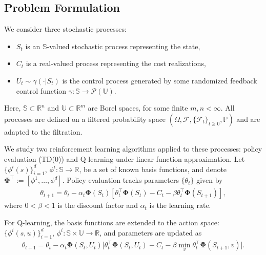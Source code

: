 \documentclass[11pt]{article}
\def\P{{\mathcal P}}
\begin{document}
\subsection{Problem Formulation}

We consider three stochastic processes:
\begin{itemize}
\item $S_t$ is an $\mathds{S}$-valued stochastic process representing the state,
\item $C_t$ is a real-valued process representing the cost realizations,
\item $U_t\sim\gamma(\cdot|S_t)$ is the control process generated by some randomized  feedback control function $\gamma:\mathds{S}\to\P(\mathds{U})$.
\end{itemize}
Here, $\mathds{S} \subset \mathds{R}^n$ and $\mathds{U} \subset \mathds{R}^m$ are Borel spaces, for some finite $m,n<\infty$. All processes are defined on a filtered probability space $(\Omega,\mathcal{F},\{\mathcal{F}_t\}_{t\ge 0},\mathbb{P})$ and are adapted to the filtration.

We study two reinforcement learning algorithms applied to these processes: policy evaluation (TD(0)) and Q-learning under linear function approximation. Let $\{\phi^i(s)\}_{i=1}^d$, $\phi^i: \mathds{S} \to \mathds{R}$, be a set of known basis functions, and denote $\mathbf{\Phi}^\intercal := [\phi^1, \dots, \phi^d]$. Policy evaluation tracks parameters $\{\theta_t\}$ given by
\begin{align}\label{main_iter_0}
\theta_{t+1} = \theta_t - \alpha_t \mathbf{\Phi}(S_t) \left[ \theta_t^\intercal \mathbf{\Phi}(S_t) - C_t - \beta \theta_t^\intercal \mathbf{\Phi}(S_{t+1}) \right],
\end{align}
where $0 < \beta < 1$ is the discount factor and $\alpha_t$ is the learning rate.

For Q-learning, the basis functions are extended to the action space: $\{\phi^i(s,u)\}_{i=1}^d$, $\phi^i: \mathds{S} \times \mathds{U} \to \mathds{R}$, and parameters are updated as
\begin{align}\label{q_iter_0}
\theta_{t+1} = \theta_t - \alpha_t \mathbf{\Phi}(S_t,U_t) \Big[ \theta_t^\intercal \mathbf{\Phi}(S_t,U_t) - C_t - \beta \min_v \theta_t^\intercal \mathbf{\Phi}(S_{t+1},v) \Big].
\end{align}
\end{document}
